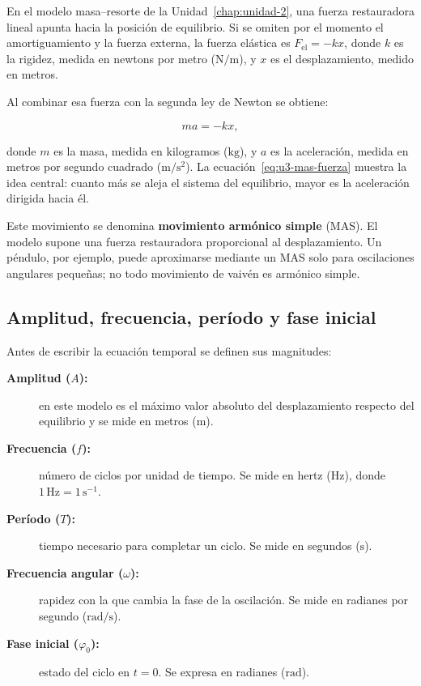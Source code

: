 En el modelo masa--resorte de la Unidad~\ref{chap:unidad-2}, una fuerza
restauradora lineal apunta hacia la posición de equilibrio. Si se omiten por
el momento el amortiguamiento y la fuerza externa, la fuerza elástica es
\(F_\mathrm{el}=-kx\), donde \(k\) es la rigidez, medida en newtons por metro
(\(\text{N}/\text{m}\)), y \(x\) es el desplazamiento, medido en metros.

Al combinar esa fuerza con la segunda ley de Newton se obtiene:

\begin{equation}
    ma=-kx,
    \label{eq:u3-mas-fuerza}
\end{equation}

donde \(m\) es la masa, medida en kilogramos (\(\text{kg}\)), y \(a\) es la
aceleración, medida en metros por segundo cuadrado
(\(\text{m}/\text{s}^{2}\)). La ecuación~\eqref{eq:u3-mas-fuerza} muestra la
idea central: cuanto más se aleja el sistema del equilibrio, mayor es la
aceleración dirigida hacia él.

Este movimiento se denomina \textbf{movimiento armónico simple} (MAS). El
modelo supone una fuerza restauradora proporcional al desplazamiento. Un
péndulo, por ejemplo, puede aproximarse mediante un MAS solo para oscilaciones
angulares pequeñas; no todo movimiento de vaivén es armónico simple.

\subsection{Amplitud, frecuencia, período y fase inicial}
\label{sec:u3-parametros-mas}

Antes de escribir la ecuación temporal se definen sus magnitudes:

\begin{description}
    \item[\textbf{Amplitud (\(A\)):}] en este modelo es el máximo valor
    absoluto del desplazamiento respecto del equilibrio y se mide en metros
    (\(\text{m}\)).
    \item[\textbf{Frecuencia (\(f\)):}] número de ciclos por unidad de tiempo.
    Se mide en hertz (\(\text{Hz}\)), donde
    \(1\,\text{Hz}=1\,\text{s}^{-1}\).
    \item[\textbf{Período (\(T\)):}] tiempo necesario para completar un ciclo.
    Se mide en segundos (\(\text{s}\)).
    \item[\textbf{Frecuencia angular (\(\omega\)):}] rapidez con la que cambia
    la fase de la oscilación. Se mide en radianes por segundo
    (\(\text{rad}/\text{s}\)).
    \item[\textbf{Fase inicial (\(\varphi_0\)):}] estado del ciclo en
    \(t=0\). Se expresa en radianes (\(\text{rad}\)).
\end{description}

